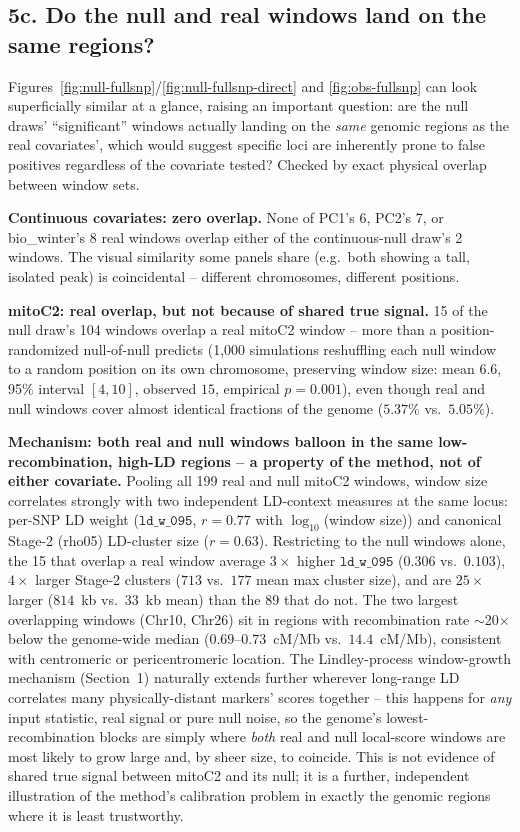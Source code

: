 \documentclass[11pt]{article}
\begin{document}
\subsection*{\color{Muted}5c. Do the null and real windows land on the same regions?}
Figures~\ref{fig:null-fullsnp}/\ref{fig:null-fullsnp-direct} and \ref{fig:obs-fullsnp} can look
superficially similar at a glance, raising an important question: are the null draws'
``significant'' windows actually landing on the \emph{same} genomic regions as the real
covariates', which would suggest specific loci are inherently prone to false positives
regardless of the covariate tested? Checked by exact physical overlap between window sets.

\textbf{Continuous covariates: zero overlap.} None of PC1's 6, PC2's 7, or bio\_winter's 8
real windows overlap either of the continuous-null draw's 2 windows. The visual similarity
some panels share (e.g.\ both showing a tall, isolated peak) is coincidental -- different
chromosomes, different positions.

\textbf{mitoC2: real overlap, but not because of shared true signal.} 15 of the null draw's
104 windows overlap a real mitoC2 window -- more than a position-randomized null-of-null
predicts (1{,}000 simulations reshuffling each null window to a random position on its own
chromosome, preserving window size: mean $6.6$, 95\% interval $[4,10]$, observed $15$,
empirical $p=0.001$), even though real and null windows cover almost identical fractions of
the genome ($5.37\%$ vs.\ $5.05\%$).

\textbf{Mechanism: both real and null windows balloon in the same low-recombination, high-LD
regions -- a property of the method, not of either covariate.} Pooling all 199 real and null
mitoC2 windows, window size correlates strongly with two independent LD-context measures at
the same locus: per-SNP LD weight ($\mathtt{ld\_w\_095}$, $r=0.77$ with $\log_{10}$(window
size)) and canonical Stage-2 (rho05) LD-cluster size ($r=0.63$). Restricting to the null
windows alone, the 15 that overlap a real window average $3\times$ higher $\mathtt{ld\_w\_095}$
($0.306$ vs.\ $0.103$), $4\times$ larger Stage-2 clusters ($713$ vs.\ $177$ mean max cluster
size), and are $25\times$ larger ($814$~kb vs.\ $33$~kb mean) than the 89 that do not. The two
largest overlapping windows (Chr10, Chr26) sit in regions with recombination rate
$\sim$20$\times$ below the genome-wide median ($0.69$--$0.73$~cM/Mb vs.\ $14.4$~cM/Mb),
consistent with centromeric or pericentromeric location. The Lindley-process window-growth
mechanism (Section~1) naturally extends further wherever long-range LD correlates many
physically-distant markers' scores together -- this happens for \emph{any} input statistic,
real signal or pure null noise, so the genome's lowest-recombination blocks are simply where
\emph{both} real and null local-score windows are most likely to grow large and, by sheer
size, to coincide. This is not evidence of shared true signal between mitoC2 and its null;
it is a further, independent illustration of the method's calibration problem in exactly the
genomic regions where it is least trustworthy.
\end{document}
